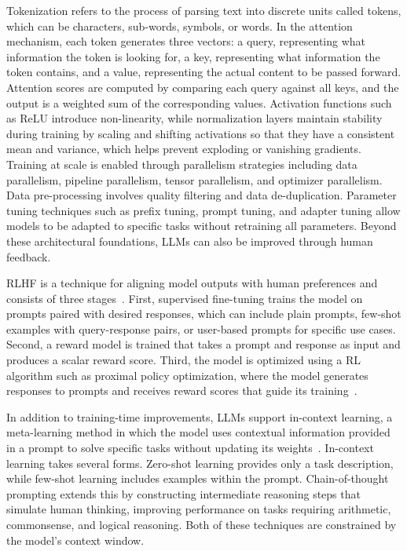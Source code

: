 \documentclass[
english,                 %
bibtex,                  %
]{kththesis}
\numberwithin{listing}{chapter}
\begin{document}
Tokenization refers to the process of parsing text into discrete units called tokens, which can be characters, sub-words, symbols, or words. In the attention mechanism, each token generates three vectors: a query, representing what information the token is looking for, a key, representing what information the token contains, and a value, representing the actual content to be passed forward. Attention scores are computed by comparing each query against all keys, and the output is a weighted sum of the corresponding values. Activation functions such as \gls{ReLU} introduce non-linearity, while normalization layers maintain stability during training by scaling and shifting activations so that they have a consistent mean and variance, which helps prevent exploding or vanishing gradients. Training at scale is enabled through parallelism strategies including data parallelism, pipeline parallelism, tensor parallelism, and optimizer parallelism. Data pre-processing involves quality filtering and data de-duplication. Parameter tuning techniques such as prefix tuning, prompt tuning, and adapter tuning allow models to be adapted to specific tasks without retraining all parameters. Beyond these architectural foundations, \glspl{LLM} can also be improved through human feedback.

\Gls{RLHF} is a technique for aligning model outputs with human preferences and consists of three stages~\cite{ouyang_training_2022}. First, supervised fine-tuning trains the model on prompts paired with desired responses, which can include plain prompts, few-shot examples with query-response pairs, or user-based prompts for specific use cases. Second, a reward model is trained that takes a prompt and response as input and produces a scalar reward score. Third, the model is optimized using a \gls{RL} algorithm such as proximal policy optimization, where the model generates responses to prompts and receives reward scores that guide its training~\cite{schulman_proximal_2017}.

In addition to training-time improvements, \glspl{LLM} support in-context learning, a meta-learning method in which the model uses contextual information provided in a prompt to solve specific tasks without updating its weights~\cite{yin_survey_2024}. In-context learning takes several forms. Zero-shot learning provides only a task description, while few-shot learning includes examples within the prompt. Chain-of-thought prompting extends this by constructing intermediate reasoning steps that simulate human thinking, improving performance on tasks requiring arithmetic, commonsense, and logical reasoning. Both of these techniques are constrained by the model's context window.
\end{document}

